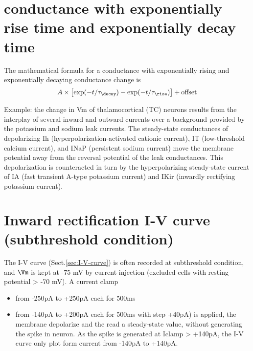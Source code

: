 \section{conductance with exponentially rise time and exponentially decay
time}
\label{sec:exponentially-rise-exponentially-decay}

The mathematical formula for a conductance with exponentially rising and
exponentially decaying conductance change is
\begin{equation}
A \times \left[ \exp(-t/\tau_\decay) - \exp(-t/\tau_\rise) \right]  +
\text{offset}
\end{equation}


%
%
Example: the change in Vm of thalamocortical (TC) neurons results from the
interplay of several inward and outward currents over a background provided by
the potassium and sodium leak currents. The steady-state conductances of
depolarizing Ih (hyperpolarization-activated cationic current), IT
(low-threshold calcium current), and INaP (persistent sodium current) move the
membrane potential away from the reversal potential of the leak conductances.
This depolarization is counteracted in turn by the hyperpolarizing steady-state
current of IA (fast transient A-type potassium current) and IKir (inwardly
rectifying potassium current). \citep{amarillo2014}


\section{Inward rectification I-V curve (subthreshold condition)}
\label{sec:I-V-curve-inward-rectification}

The I-V curve (Sect.\ref{sec:I-V-curve}) is often recorded at subthreshold
condition, and $\Vm$ is kept at -75 mV by current injection (excluded cells
with resting potential > -70 mV).
A current clamp
\begin{itemize}
  \item from -250pA to +250pA each for 500ms

  \item from -140pA to +200pA each for 500ms with step +40pA) is
applied, the membrane depolarize and the read a steady-state value,
without generating the spike in neuron. As the spike is generated at Iclamp >
+140pA, the I-V curve only plot form current from -140pA to +140pA.

\end{itemize}

